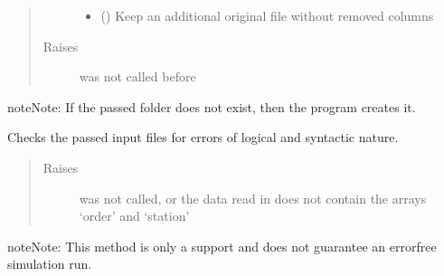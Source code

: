 \documentclass[letterpaper,10pt,english]{sphinxmanual}
\begin{document}
\begin{fulllineitems}
\begin{fulllineitems}
\begin{quote}
\begin{description}
\begin{itemize}
\item {} 
\sphinxAtStartPar
{} (\sphinxstyleliteralemphasis{\sphinxupquote{, }}) \textendash{} Keep an additional original file without removed columns

\end{itemize}

\item[{Raises}] \leavevmode
\sphinxAtStartPar
{} \textendash{}  was not called before

\end{description}\end{quote}

\begin{sphinxadmonition}{note}{Note:}
\sphinxAtStartPar
If the passed folder does not exist, then the program creates it.
\end{sphinxadmonition}

\end{fulllineitems}


\begin{fulllineitems}
\label{\detokenize{source/API/api:environment.Environment.inspect}}
\sphinxAtStartPar
Checks the passed input files for errors of logical and syntactic nature.
\begin{quote}\begin{description}
\item[{Raises}] \leavevmode
\sphinxAtStartPar
{} \textendash{}  was not called, or the data read in does not contain the arrays
‘order’ and ‘station’

\end{description}\end{quote}

\begin{sphinxadmonition}{note}{Note:}
\sphinxAtStartPar
This method is only a support and does not guarantee an error\sphinxhyphen{}free simulation run.
\end{sphinxadmonition}


\end{fulllineitems}
\end{fulllineitems}
\end{document}
